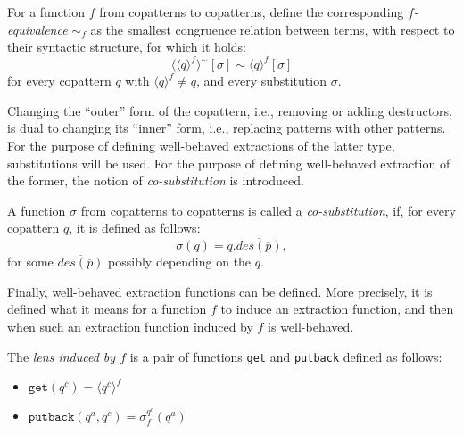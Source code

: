 \begin{definition}[$f$-equivalence]
For a function $f$ from copatterns to copatterns, define the corresponding \textit{$f$-equivalence} $\sim_f$ as the smallest congruence relation between terms, with respect to their syntactic structure, for which it holds:
\[
\langle \langle q \rangle^f \rangle^{\sim}[\sigma] \sim \langle q \rangle^f[\sigma]
\]
for every copattern $q$ with $\langle q \rangle^f \neq q$, and every substitution $\sigma$.
\end{definition}

Changing the ``outer'' form of the copattern, i.e., removing or adding destructors, is dual to changing its ``inner'' form, i.e., replacing patterns with other patterns. For the purpose of defining well-behaved extractions of the latter type, substitutions will be used. For the purpose of defining well-behaved extraction of the former, the notion of \textit{co-substitution} is introduced.

\begin{definition}[Co-substitution]
A function $\sigma$ from copatterns to copatterns is called a \textit{co-substitution}, if, for every copattern $q$, it is defined as follows:
\[
\sigma(q) = q.\overline{des(\overline{p})},
\]
for some $\overline{des(\overline{p})}$ possibly depending on the $q$.
\end{definition}

Finally, well-behaved extraction functions can be defined. More precisely, it is defined what it means for a function $f$ to induce an extraction function, and then when such an extraction function induced by $f$ is well-behaved.

\begin{definition}
The \textit{lens induced by $f$} is a pair of functions \texttt{get} and \texttt{putback} defined as follows:
\begin{itemize}
\item $\mathtt{get}(q^c) = \langle q^c \rangle^f$
\item $\mathtt{putback}(q^a, q^c) = \sigma^{q^c}_f(q^a)$
\end{itemize}
\end{definition}

